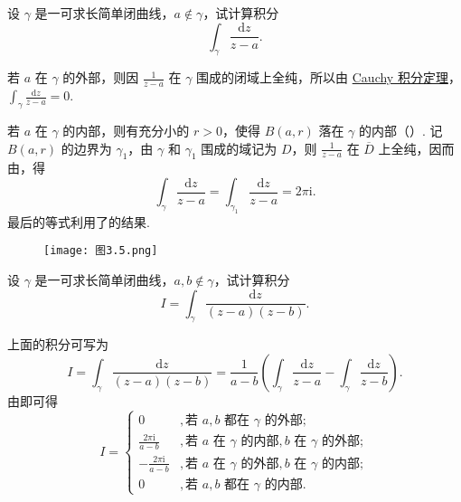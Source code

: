\documentclass[../../main.tex]{subfiles}
\begin{document}
\begin{example}\label{example:例3.2.7}
设 \( \gamma \) 是一可求长简单闭曲线，\( a \notin \gamma \)，试计算积分
\[
\int_\gamma \frac{\mathrm{d}z}{z - a}.
\]
\end{example}
\begin{solution}
若 \( a \) 在 \( \gamma \) 的外部，则因 \( \frac{1}{z - a} \) 在 \( \gamma \) 围成的闭域上全纯，所以由 \hyperref[theorem:Cauchy-Goursat定理(Cauchy积分定理)]{Cauchy 积分定理}，\( \int_\gamma \frac{\mathrm{d}z}{z - a} = 0 \).

若 \( a \) 在 \( \gamma \) 的内部，则有充分小的 \( r > 0 \)，使得 \( B(a, r) \) 落在 \( \gamma \) 的内部（）. 记 \( B(a, r) \) 的边界为 \( \gamma_1 \)，由 \( \gamma \) 和 \( \gamma_1 \) 围成的域记为 \( D \)，则 \( \frac{1}{z - a} \) 在 \( \overline{D} \) 上全纯，因而由，得
\[
\int_\gamma \frac{\mathrm{d}z}{z - a} = \int_{\gamma_1} \frac{\mathrm{d}z}{z - a} = 2\pi \mathrm{i}.
\]
最后的等式利用了的结果.

\begin{figure}[H]
\centering
\texttt{[image: 图3.5.png]}
\caption{}
\label{figure:图3.5}
\end{figure}

\end{solution}

\begin{example}
设 \( \gamma \) 是一可求长简单闭曲线，\( a, b \notin \gamma \)，试计算积分
\[
I = \int_\gamma \frac{\mathrm{d}z}{(z - a)(z - b)}.
\]
\end{example}
\begin{solution}
上面的积分可写为
\[
I = \int_\gamma \frac{\mathrm{d}z}{(z - a)(z - b)}
= \frac{1}{a - b} \left( \int_\gamma \frac{\mathrm{d}z}{z - a} - \int_\gamma \frac{\mathrm{d}z}{z - b} \right).
\]
由即可得
\[
I = 
\begin{cases} 
0&,  \text{若 } a, b \text{ 都在 } \gamma \text{ 的外部}; \\
\frac{2\pi \mathrm{i}}{a - b}&,  \text{若 } a \text{ 在 } \gamma \text{ 的内部}, b \text{ 在 } \gamma \text{ 的外部}; \\
-\frac{2\pi \mathrm{i}}{a - b}&,  \text{若 } a \text{ 在 } \gamma \text{ 的外部}, b \text{ 在 } \gamma \text{ 的内部}; \\
0&,  \text{若 } a, b \text{ 都在 } \gamma \text{ 的内部}.
\end{cases}
\]

\end{solution}
\end{document}
